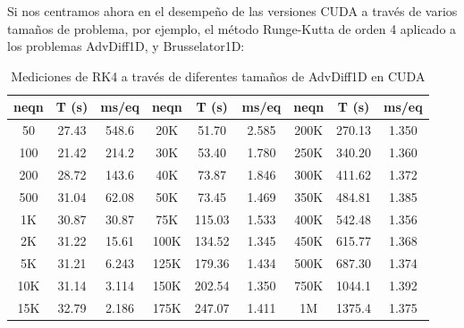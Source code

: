 Si nos centramos ahora en el desempeño de las versiones CUDA a través de varios tamaños de problema, por ejemplo, el método Runge-Kutta de orden 4 aplicado a los problemas AdvDiff1D, y Brusselator1D:

\begin{table}[H]
	\centering
	\begin{tabular}{| c | c | c || c | c | c || c | c | c |}
		\hline
		\textbf{neqn} & \textbf{T (s)} & \textbf{ms/eq} &
		\textbf{neqn} & \textbf{T (s)} & \textbf{ms/eq} &
		\textbf{neqn} & \textbf{T (s)} & \textbf{ms/eq} \\
		\hline
		
		50   & 27.43 & 548.6    & 20K   & 51.70  & 2.585   & 200K & 270.13  & 1.350 \\
		100  & 21.42 & 214.2    & 30K   & 53.40  & 1.780   & 250K & 340.20  & 1.360 \\
		200  & 28.72 & 143.6    & 40K   & 73.87  & 1.846   & 300K & 411.62  & 1.372 \\
		500  & 31.04 & 62.08   & 50K   & 73.45  & 1.469   & 350K & 484.81  & 1.385 \\
		1K   & 30.87 & 30.87   & 75K   & 115.03 & 1.533   & 400K & 542.48  & 1.356 \\
		2K   & 31.22 & 15.61   & 100K  & 134.52 & 1.345   & 450K & 615.77  & 1.368 \\
		5K   & 31.21 & 6.243   & 125K  & 179.36 & 1.434   & 500K & 687.30  & 1.374 \\
		10K  & 31.14 & 3.114   & 150K  & 202.54 & 1.350   & 750K & 1044.1 & 1.392 \\
		15K  & 32.79 & 2.186   & 175K  & 247.07 & 1.411   & 1M   & 1375.4 & 1.375 \\
		\hline
	\end{tabular}
	\caption{Mediciones de RK4 a través de diferentes tamaños de AdvDiff1D en CUDA}
	\label{tab:CUDA-Adv1D-Tams}
\end{table}


